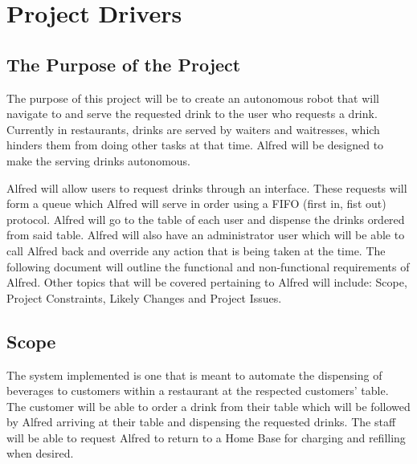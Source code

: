 \documentclass [11pt]{article}
\begin{document}
\section {\textbf{Project Drivers}}

\subsection{The Purpose of the Project} 
The purpose of this project will be to create an autonomous robot that will navigate to and serve the requested drink to the user who requests a drink. Currently in restaurants, drinks are served by waiters and waitresses, which hinders them from doing other tasks at that time. Alfred will be designed to make the serving drinks autonomous. \newline

Alfred will allow users to request drinks through an interface. These requests will form a queue which Alfred will serve in order using a FIFO (first in, fist out) protocol. Alfred will go to the table of each user and dispense the drinks ordered from said table. Alfred will also have an administrator user which will be able to call Alfred back and override any action that is being taken at the time. The following document will outline the functional and non-functional requirements of Alfred.  Other topics that will be covered pertaining to Alfred will include: Scope, Project Constraints, Likely Changes and Project Issues.

\subsection{Scope}
The system implemented is one that is meant to automate the dispensing of beverages to customers within a restaurant at the respected customers' table. The customer will be able to order a drink from their table which will be followed by Alfred arriving at their table and dispensing the requested drinks. The staff will be able to request Alfred to return to a Home Base for charging and refilling when desired. 

\end{document}
